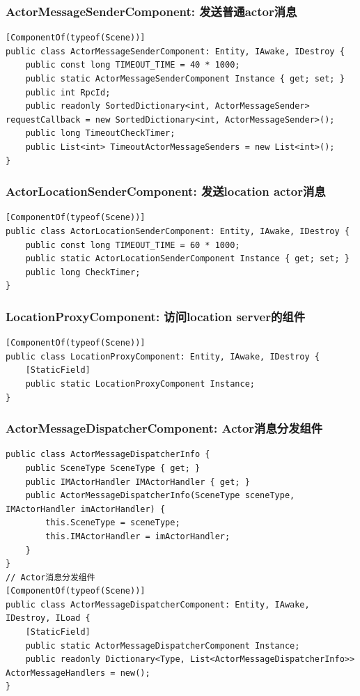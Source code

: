 \documentclass[9pt, b5paper]{article}
\begin{document}
\subsubsection{ActorMessageSenderComponent: 发送普通actor消息}
\label{sec-1-4-1}
\begin{verbatim}
[ComponentOf(typeof(Scene))]
public class ActorMessageSenderComponent: Entity, IAwake, IDestroy {
    public const long TIMEOUT_TIME = 40 * 1000;
    public static ActorMessageSenderComponent Instance { get; set; }
    public int RpcId;
    public readonly SortedDictionary<int, ActorMessageSender> requestCallback = new SortedDictionary<int, ActorMessageSender>();
    public long TimeoutCheckTimer;
    public List<int> TimeoutActorMessageSenders = new List<int>();
}
\end{verbatim}
\subsubsection{ActorLocationSenderComponent: 发送location actor消息}
\label{sec-1-4-2}
\begin{verbatim}
[ComponentOf(typeof(Scene))]
public class ActorLocationSenderComponent: Entity, IAwake, IDestroy {
    public const long TIMEOUT_TIME = 60 * 1000;
    public static ActorLocationSenderComponent Instance { get; set; }
    public long CheckTimer;
}
\end{verbatim}
\subsubsection{LocationProxyComponent: 访问location server的组件}
\label{sec-1-4-3}
\begin{verbatim}
[ComponentOf(typeof(Scene))]
public class LocationProxyComponent: Entity, IAwake, IDestroy {
    [StaticField]
    public static LocationProxyComponent Instance;
}
\end{verbatim}
\subsubsection{ActorMessageDispatcherComponent: Actor消息分发组件}
\label{sec-1-4-4}
\begin{verbatim}
public class ActorMessageDispatcherInfo {
    public SceneType SceneType { get; }
    public IMActorHandler IMActorHandler { get; }
    public ActorMessageDispatcherInfo(SceneType sceneType, IMActorHandler imActorHandler) {
        this.SceneType = sceneType;
        this.IMActorHandler = imActorHandler;
    }
}
// Actor消息分发组件
[ComponentOf(typeof(Scene))]
public class ActorMessageDispatcherComponent: Entity, IAwake, IDestroy, ILoad {
    [StaticField]
    public static ActorMessageDispatcherComponent Instance;
    public readonly Dictionary<Type, List<ActorMessageDispatcherInfo>> ActorMessageHandlers = new();
}
\end{verbatim}
\end{document}
